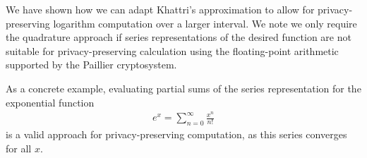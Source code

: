 We have shown how we can adapt Khattri's approximation to allow for privacy-preserving logarithm computation over a larger interval. We note we only require the quadrature approach if series representations of the desired function are not suitable for privacy-preserving calculation using the floating-point arithmetic supported by the Paillier cryptosystem.

As a concrete example, evaluating partial sums of the series representation for the exponential function
\begin{align*}
	e^x = \sum_{n=0}^{\infty}{\frac{x^n}{n!}}
\end{align*}
is a valid approach for privacy-preserving computation, as this series converges for all $x$.
